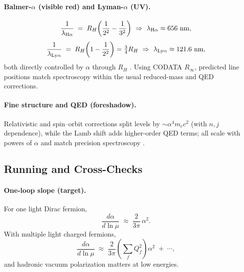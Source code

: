 \documentclass[11pt,oneside]{article}
\begin{document}
\paragraph{Balmer-$\alpha$ (visible red) and Lyman-$\alpha$ (UV).}
\begin{equation}
\frac{1}{\lambda_{\rm H\alpha}} \;=\; R_H\!\left(\frac{1}{2^2}-\frac{1}{3^2}\right)\ \Rightarrow\ \lambda_{\rm H\alpha}\approx 656~\mathrm{nm},
\end{equation}
\begin{equation}
\frac{1}{\lambda_{\rm Ly\alpha}} \;=\; R_H\!\left(1-\frac{1}{2^2}\right)=\tfrac{3}{4}R_H\ \Rightarrow\ \lambda_{\rm Ly\alpha}\approx 121.6~\mathrm{nm},
\end{equation}
both directly controlled by $\alpha$ through $R_H$ \cite{rydberg1890,fowler1922hydrogen}. Using CODATA $R_\infty$, predicted line positions match spectroscopy within the usual reduced-mass and QED corrections.

\paragraph{Fine structure and QED (foreshadow).}
Relativistic and spin--orbit corrections split levels by $\sim \alpha^4 m_e c^2$ (with $n,j$ dependence), while the Lamb shift adds higher-order QED terms; all scale with powers of $\alpha$ and match precision spectroscopy \cite{dirac1930principles,bethe1947lamb,griffiths2018quantum}.

\subsection{Running and Cross-Checks}

\paragraph{One-loop slope (target).}
For one light Dirac fermion,
\begin{equation}
\frac{d\alpha}{d\ln\mu} \;\approx\; \frac{2}{3\pi}\,\alpha^2.
\end{equation}
With multiple light charged fermions,
\begin{equation}
\frac{d\alpha}{d\ln\mu} \;\approx\; \frac{2}{3\pi}\!\left(\sum_f Q_f^2\right)\alpha^2 \;+\; \cdots,
\end{equation}
and hadronic vacuum polarization matters at low energies.
\end{document}
